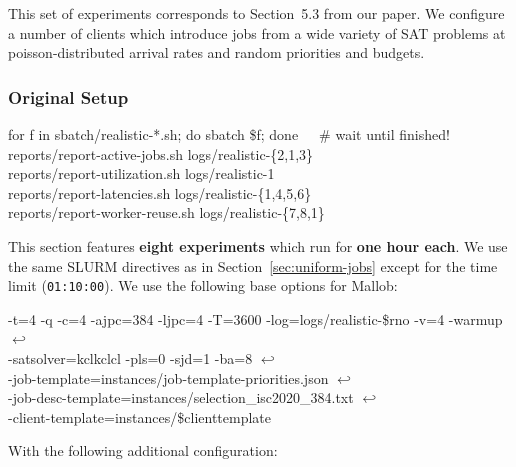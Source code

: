 \documentclass[runningheads]{article}
\newcommand{\CR}{{\tiny$\hookleftarrow$}}
\numberwithin{dummy}{subsection}
\begin{document}
This set of experiments corresponds to Section~5.3 from our paper.
We configure a number of clients which introduce jobs from a wide variety of SAT problems at poisson-distributed arrival rates and random priorities and budgets.

\subsubsection{Original Setup}
\label{sec:realistic-original}

\begin{tcolorbox}[
  colback=Magenta!5!white,
  colframe=Magenta!75!black,
  title={\centering Commands for Original Setup}]
\begin{ttfenvcompact}
for f in sbatch/realistic-*.sh; do sbatch \$f; done\ \ \ \# wait until finished!\\
reports/report-active-jobs.sh logs/realistic-\{2,1,3\}\\
reports/report-utilization.sh logs/realistic-1\\
reports/report-latencies.sh logs/realistic-\{1,4,5,6\}\\
reports/report-worker-reuse.sh logs/realistic-\{7,8,1\}
\end{ttfenvcompact}
\end{tcolorbox}

This section features \textbf{eight experiments} which run for \textbf{one hour each}.
We use the same SLURM directives as in Section~\ref{sec:uniform-jobs} except for the time limit (\texttt{01:10:00}).
We use the following base options for Mallob:

\begin{ttfenv}
-t=4 -q -c=4 -ajpc=384 -ljpc=4 -T=3600 -log=logs/realistic-\$rno -v=4 -warmup \CR\\
-satsolver=kclkclcl -pls=0 -sjd=1 -ba=8  \CR\\
 -job-template=instances/job-template-priorities.json  \CR\\
 -job-desc-template=instances/selection\_isc2020\_384.txt  \CR\\
 -client-template=instances/\$clienttemplate
\end{ttfenv}

With the following additional configuration:\\
\end{document}
